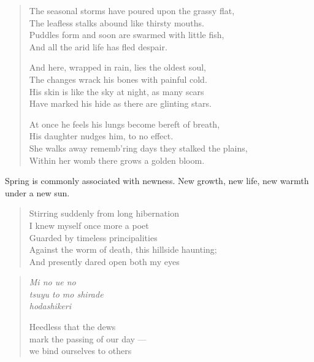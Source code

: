 \documentclass{memoir}
\begin{document}
\begin{verse}
The seasonal storms have poured upon the grassy flat, \\
The leafless stalks abound like thirsty mouths. \\
Puddles form and soon are swarmed with little fish, \\
And all the arid life has fled despair.

And here, wrapped in rain, lies the oldest soul, \\
The changes wrack his bones with painful cold. \\
His skin is like the sky at night, as many scars \\
Have marked his hide as there are glinting stars.

At once he feels his lungs become bereft of breath, \\
His daughter nudges him, to no effect. \\
She walks away rememb'ring days they stalked the plains, \\
Within her womb there grows a golden bloom.

\parencite[26]{leaves}
\end{verse}

Spring is commonly associated with newness. New growth, new life, new warmth under a new sun. 

\begin{verse}
Stirring suddenly from long hibernation \\
I knew myself once more a poet \\
Guarded by timeless principalities \\
Against the worm of death, this hillside haunting; \\
And presently dared open both my eyes

\parencite[165]{graves_poems}
\end{verse}

\begin{verse}
\emph{Mi no ue no} \\
\emph{tsuyu to mo shirade} \\
\emph{hodashikeri}

Heedless that the dews \\
mark the passing of our day --- \\
we bind ourselves to others

\parencite[11]{issa}
\end{verse}

\printbibliography
\end{document}
